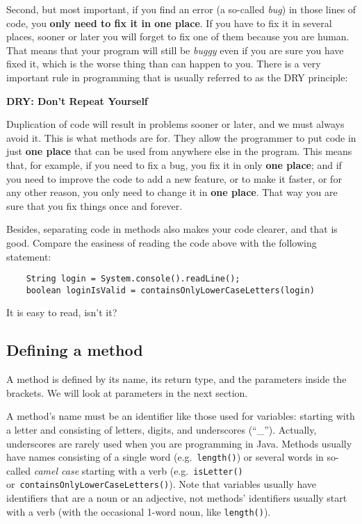 Second, but most important, if you find an error (a so-called
\emph{bug}) in those lines of code, you \textbf{only need to fix it in one
place}. If you have to fix it in several places, sooner or later you
will forget to fix one of them because you are human. That means that your
program will still be \emph{buggy} even if you are sure you have fixed
it, which is the worse thing than can happen to you. There is a very
important rule in programming that is usually referred to as the DRY
principle: 

\begin{center}
\vspace{1em}
\textbf{\large DRY: Don't Repeat Yourself}
\vspace{1em}
\end{center}

Duplication of code will result in problems sooner or later, and
we must always avoid it. This is what methods are for. They allow the
programmer to put code in just \textbf{one place} 
that can be used from
anywhere else in the program. This means that, for example, if you
need to fix a bug, you fix it in only \textbf{one place}; 
and if you need to
improve the code to add a new feature, or to make it faster, or for
any other reason, you only need to change it 
in \textbf{one place}. That way
you are sure that you fix things once and forever. 

Besides, separating code in methods also makes your code
clearer, and that is good. 
Compare the easiness of reading the code above with the
following statement: 

\begin{verbatim}
    String login = System.console().readLine();
    boolean loginIsValid = containsOnlyLowerCaseLetters(login)
\end{verbatim}

It is easy to read, isn't it?

\subsection{Defining a method}

A method is defined by its name, its return type, and the parameters
inside the brackets. We will look at parameters in the next section.

A method's name must be an identifier
like those used for variables: starting with a letter and consisting
of letters, digits, and underscores (``\_''). Actually, underscores
are rarely used when you are programming in Java. Methods
usually have names consisting of a single word
(e.g.~\verb+length()+) or several words in so-called \emph{camel case}
starting with a verb (e.g.~\verb+isLetter()+
or~\verb+containsOnlyLowerCaseLetters()+). Note that variables usually
have identifiers that are a noun or an adjective, not methods'
identifiers usually start with a verb (with the occasional 1-word
noun, like \verb+length()+).

